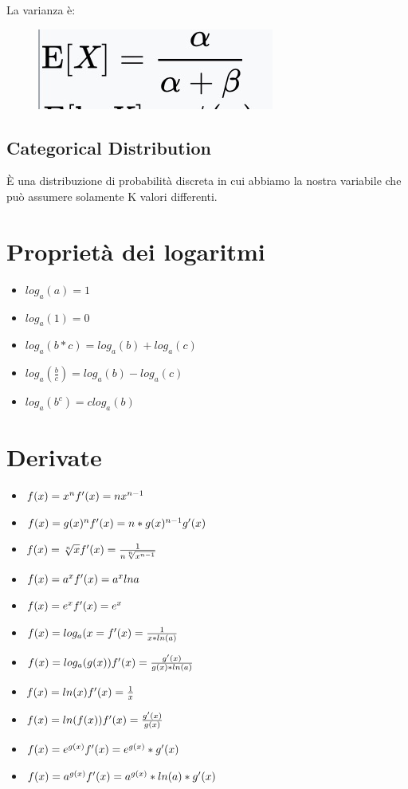 \documentclass[14pt]{extreport}
\begin{document}
La varianza è:
\begin{figure}[H]
\centering
\includegraphics[width=0.4\linewidth]{125.jpeg}
\end{figure}

\subsection{Categorical Distribution}

È una distribuzione di probabilità discreta in cui abbiamo la nostra variabile che può assumere solamente K valori differenti.


\section{Proprietà dei logaritmi}

\begin{itemize}
\item $log_a(a) = 1$
\item $log_a(1) = 0$
\item $log_a(b*c) = log_a(b)+log_a(c)$
\item $log_a(\frac{b}{c}) = log_a(b)-log_a(c)$ 
\item $log_a(b^c) = clog_a(b)$
\end{itemize}

\section{Derivate}

\begin{itemize}
\item $f(x) = x^n \\f'(x)=nx^{n-1}$
\item $f(x) = g(x)^n \\f'(x)= n*g(x)^{n-1}g'(x)$
\item $f(x) = \sqrt[n]{x}  \\ f'(x)=\frac{1}{n\sqrt[n]{x^{n-1}}}$
\item $f(x) = a^x  \\f'(x)= a^xlna$
\item $f(x) = e^x \\f'(x)= e^x$
\item $f(x) = log_a(x= \\f'(x)= \frac{1}{x*ln(a)}$
\item $f(x) = log_a(g(x)) \\f'(x) = \frac{g'(x)}{g(x)*ln(a)}$
\item $f(x) = ln(x) \\f'(x)=\frac{1}{x}$
\item $f(x) = ln(f(x)) \\f'(x) = \frac{g'(x)}{g(x)}$
\item $f(x) = e^{g(x)} \\f'(x) = e^{g(x)}*g'(x)$
\item $f(x) = a^{g(x)} \\f'(x) = a^{g(x)}*ln(a)*g'(x)$
\end{itemize}
\end{document}
